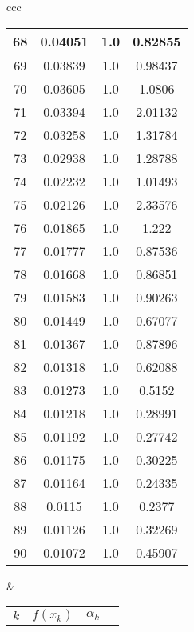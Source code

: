 \documentclass{article}
\begin{document}
\begin{center}
\begin{tabular}{ccc}
\begin{tabular}{|c|c|c|c|}
            \hline
            68 & 0.04051 & 1.0 & 0.82855 \\ 
            \hline
            69 & 0.03839 & 1.0 & 0.98437 \\ 
            \hline
            70 & 0.03605 & 1.0 & 1.0806 \\ 
            \hline
            71 & 0.03394 & 1.0 & 2.01132 \\ 
            \hline
            72 & 0.03258 & 1.0 & 1.31784 \\ 
            \hline
            73 & 0.02938 & 1.0 & 1.28788 \\ 
            \hline
            74 & 0.02232 & 1.0 & 1.01493 \\ 
            \hline
            75 & 0.02126 & 1.0 & 2.33576 \\ 
            \hline
            76 & 0.01865 & 1.0 & 1.222 \\ 
            \hline
            77 & 0.01777 & 1.0 & 0.87536 \\ 
            \hline
            78 & 0.01668 & 1.0 & 0.86851 \\ 
            \hline
            79 & 0.01583 & 1.0 & 0.90263 \\ 
            \hline
            80 & 0.01449 & 1.0 & 0.67077 \\ 
            \hline
            81 & 0.01367 & 1.0 & 0.87896 \\ 
            \hline
            82 & 0.01318 & 1.0 & 0.62088 \\ 
            \hline
            83 & 0.01273 & 1.0 & 0.5152 \\ 
            \hline
            84 & 0.01218 & 1.0 & 0.28991 \\ 
            \hline
            85 & 0.01192 & 1.0 & 0.27742 \\ 
            \hline
            86 & 0.01175 & 1.0 & 0.30225 \\ 
            \hline
            87 & 0.01164 & 1.0 & 0.24335 \\ 
            \hline
            88 & 0.0115 & 1.0 & 0.2377 \\ 
            \hline
            89 & 0.01126 & 1.0 & 0.32269 \\ 
            \hline
            90 & 0.01072 & 1.0 & 0.45907 \\ 
            \hline
            \end{tabular}
            &
            \begin{tabular}{|c|c|c|c|}
            \hline 
            $k$ & $f(x_k)$ & $\alpha_k$ & 

\end{tabular}
\end{tabular}
\end{center}
\end{document}
